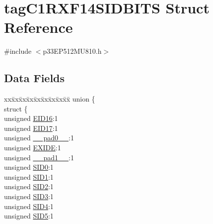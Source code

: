 \hypertarget{structtag_c1_r_x_f14_s_i_d_b_i_t_s}{}\section{tag\+C1\+R\+X\+F14\+S\+I\+D\+B\+I\+TS Struct Reference}
\label{structtag_c1_r_x_f14_s_i_d_b_i_t_s}


{\ttfamily \#include $<$p33\+E\+P512\+M\+U810.\+h$>$}

\subsection*{Data Fields}
\begin{DoxyCompactItemize}
\item 
\begin{tabbing}
xx\=xx\=xx\=xx\=xx\=xx\=xx\=xx\=xx\=\kill
union \{\\
\>struct \{\\
\>\>unsigned \hyperlink{structtag_c1_r_x_f14_s_i_d_b_i_t_s_a6dd5663b0c9838c56db040560ca0efa1}{EID16}:1\\
\>\>unsigned \hyperlink{structtag_c1_r_x_f14_s_i_d_b_i_t_s_aa648615464b0eb29967529333eee9fd9}{EID17}:1\\
\>\>unsigned \hyperlink{structtag_c1_r_x_f14_s_i_d_b_i_t_s_adf71f3d8410c1f1dbbc96680a92c49af}{\_\_pad0\_\_}:1\\
\>\>unsigned \hyperlink{structtag_c1_r_x_f14_s_i_d_b_i_t_s_a09ff1c1be3927220bd3dfbc10edfe243}{EXIDE}:1\\
\>\>unsigned \hyperlink{structtag_c1_r_x_f14_s_i_d_b_i_t_s_acaf2d0924a107ec6e8d2e31febaf66f9}{\_\_pad1\_\_}:1\\
\>\>unsigned \hyperlink{structtag_c1_r_x_f14_s_i_d_b_i_t_s_a1ca276ac15df60e1f7b9a6d0011ade93}{SID0}:1\\
\>\>unsigned \hyperlink{structtag_c1_r_x_f14_s_i_d_b_i_t_s_a3405d354f81391f879648f69f504dfc8}{SID1}:1\\
\>\>unsigned \hyperlink{structtag_c1_r_x_f14_s_i_d_b_i_t_s_ad744966dfc49307f731b7045b01b94e5}{SID2}:1\\
\>\>unsigned \hyperlink{structtag_c1_r_x_f14_s_i_d_b_i_t_s_a9345f3e64720be93e83d8dfc827f3f45}{SID3}:1\\
\>\>unsigned \hyperlink{structtag_c1_r_x_f14_s_i_d_b_i_t_s_aefb106fed4bb40e2c3c71ac612c554e3}{SID4}:1\\
\>\>unsigned \hyperlink{structtag_c1_r_x_f14_s_i_d_b_i_t_s_a0f221b3c9612231686bf87ccdcec8489}{SID5}:1\\

\end{tabbing}
\end{DoxyCompactItemize}
